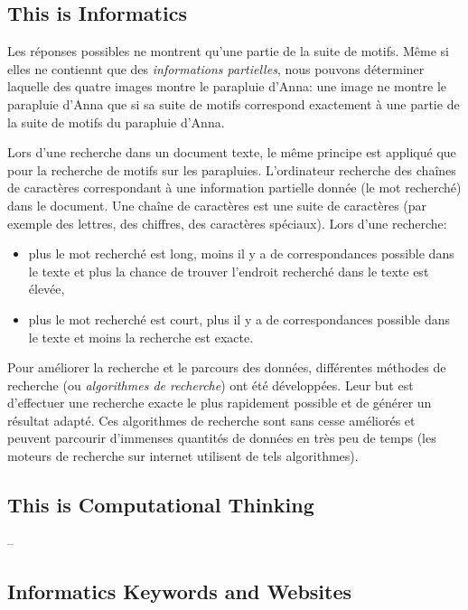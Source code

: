 \documentclass[a4paper,11pt]{report}
\begin{document}
\subsection*{This is Informatics}

Les réponses possibles ne montrent qu’une partie de la suite de motifs. Même si elles ne contiennt que des \emph{informations partielles}, nous pouvons déterminer laquelle des quatre images montre le parapluie d’Anna: une image ne montre le parapluie d’Anna que si sa suite de motifs correspond exactement à une partie de la suite de motifs du parapluie d’Anna.

Lors d’une recherche dans un document texte, le même principe est appliqué que pour la recherche de motifs sur les parapluies. L’ordinateur recherche des chaînes de caractères correspondant à une information partielle donnée (le mot recherché) dans le document. Une chaîne de caractères est une suite de caractères (par exemple des lettres, des chiffres, des caractères spéciaux). Lors d’une recherche:

\begin{itemize}
  \item plus le mot recherché est long, moins il y a de correspondances possible dans le texte et plus la chance de trouver l’endroit recherché dans le texte est élevée,
  \item plus le mot recherché est court, plus il y a de correspondances possible dans le texte et moins la recherche est exacte.
\end{itemize}

Pour améliorer la recherche et le parcours des données, différentes méthodes de recherche (ou \emph{algorithmes de recherche}) ont été développées. Leur but est d’effectuer une recherche exacte le plus rapidement possible et de générer un résultat adapté. Ces algorithmes de recherche sont sans cesse améliorés et peuvent parcourir d’immenses quantités de données en très peu de temps (les moteurs de recherche sur internet utilisent de tels algorithmes).


\subsection*{This is Computational Thinking}

–


\subsection*{Informatics Keywords and Websites}
\end{document}

